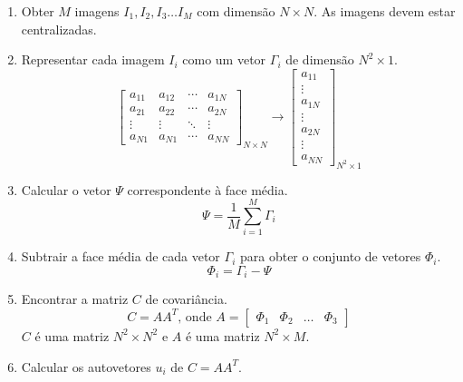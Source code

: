\begin{enumerate}
    \item Obter $M$ imagens $I_1, I_2, I_3 \ldots I_M$ com dimensão $N \times N$.
    As imagens devem estar centralizadas.
    \item Representar cada imagem $I_i$ como um vetor $\Gamma_i$ de dimensão $N^2 \times 1$.
    \begin{equation} \label{eq:eign_gamma}
        \begin{bmatrix}
        a_{11} & a_{12} & \cdots & a_{1N}\\ 
        a_{21} & a_{22} & \cdots & a_{2N}\\ 
        \vdots & \vdots & \ddots & \vdots\\ 
        a_{N1} & a_{N1} & \cdots & a_{NN}
        \end{bmatrix}_{N \times N} \rightarrow \begin{bmatrix}
        a_{11}\\ 
        \vdots\\ 
        a_{1N}\\ 
        \vdots\\ 
        a_{2N}\\
        \vdots\\ 
        a_{NN}
        \end{bmatrix}_{N^2 \times 1}
    \end{equation}
    \item Calcular o vetor $\Psi$ correspondente à face média.
    \begin{equation} \label{eq:eign_media}
        \Psi = \frac{1}{M}\sum_{i=1}^{M}\Gamma_i
    \end{equation}
    \item Subtrair a face média de cada vetor $\Gamma_i$ para obter o conjunto de vetores $\Phi_i$.
    \begin{equation} \label{eq:eign_phi}
        \Phi_i = \Gamma_i - \Psi
    \end{equation}
    \item Encontrar a matriz $C$ de covariância.
    \begin{equation} \label{eq:eign_c}
        C = AA^T \text{, onde } A = \begin{bmatrix}\Phi_1  & \Phi_2 & \ldots  & \Phi_3\end{bmatrix}
    \end{equation}
    $C$ é uma matriz $N^2 \times N^2$ e $A$ é uma matriz $N^2 \times M$.
    \item Calcular os autovetores $u_i$ de $C = AA^T$.
    

\end{enumerate}

